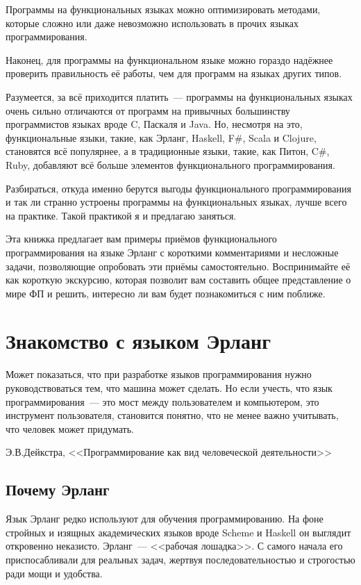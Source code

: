 \documentclass[
  paper=a4,
  fontsize=14pt,
  openany,
  appendixprefix=true
]{scrbook}
\begin{document}
Программы на функциональных языках можно оптимизировать методами, которые сложно или даже невозможно использовать в прочих языках программирования.

Наконец, для программы на функциональном языке можно гораздо надёжнее проверить правильность её работы, чем для программ на языках других типов.

Разумеется, за всё приходится платить~--- программы на функциональных языках очень сильно отличаются от программ на привычных большинству программистов языках вроде C, Паскаля и Java. Но, несмотря на это, функциональные языки, такие, как Эрланг, Haskell, F\#, Scala и Clojure, становятся всё популярнее, а в традиционные языки, такие, как Питон, C\#, Ruby, добавляют всё больше элементов функционального программирования.

Разбираться, откуда именно берутся выгоды функционального программирования и так ли странно устроены программы на функциональных языках, лучше всего на практике. Такой практикой я и предлагаю заняться.

Эта книжка предлагает вам примеры приёмов функционального программирования на языке Эрланг с короткими комментариями и несложные задачи, позволяющие опробовать эти приёмы самостоятельно. Воспринимайте её как короткую экскурсию, которая позволит вам составить общее представление о мире ФП и решить, интересно ли вам будет познакомиться с ним поближе.

\chapter{Знакомство с языком Эрланг}

\epigraph{Может показаться, что при разработке языков программирования нужно руководствоваться тем, что машина может сделать. Но если учесть, что язык программирования~--- это мост между пользователем и компьютером, это инструмент пользователя, становится понятно, что не менее важно учитывать, что человек может придумать.}{Э.В.Дейкстра, <<Программирование как вид человеческой деятельности>>}

\section{Почему Эрланг}

Язык Эрланг редко используют для обучения программированию. На фоне стройных и изящных академических языков вроде Scheme и Haskell он выглядит откровенно неказисто. Эрланг~--- <<рабочая лошадка>>. С самого начала его приспосабливали для реальных задач, жертвуя последовательностью и строгостью ради мощи и удобства.
\end{document}
